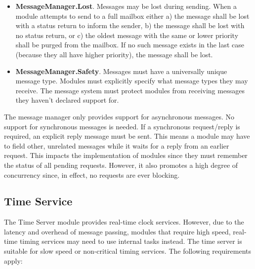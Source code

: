\begin{itemize}
\item \textbf{MessageManager.Lost}. Messages may be lost during sending. When a module attempts
  to send to a full mailbox either a) the message shall be lost with a status return to inform
  the sender, b) the message shall be lost with no status return, or c) the oldest message with
  the same or lower priority shall be purged from the mailbox. If no such message exists in the
  last case (because they all have higher priority), the message shall be lost.
\item \textbf{MessageManager.Safety}. Messages must have a universally unique message type. Modules must explicitly specify what message types they may receive. The message system must protect modules from receiving messages they haven't declared support for.
\end{itemize}

The message manager only provides support for asynchronous messages. No support for synchronous
messages is needed. If a synchronous request/reply is required, an explicit reply message must
be sent. This means a module may have to field other, unrelated messages while it waits for a
reply from an earlier request. This impacts the implementation of modules since they must
remember the status of all pending requests.  However, it also promotes a high degree of concurrency since, in
effect, no requests are ever blocking.

\subsection{Time Service}
\label{sec:time-service}

The Time Server module provides real-time clock services. However, due to the latency and
overhead of message passing, modules that require high speed, real-time timing services may need
to use internal tasks instead. The time server is suitable for slow speed or non-critical timing
services.  The following requirements apply:

